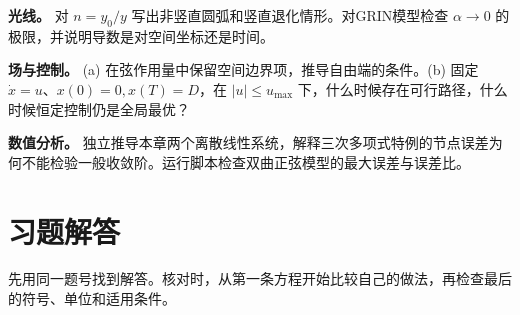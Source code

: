 \begin{bookexercises}
\item {} \textbf{光线。} 对 $n=y_0/y$ 写出非竖直圆弧和竖直退化情形。对GRIN模型检查 $\alpha\to0$ 的极限，并说明导数是对空间坐标还是时间。
\item {} \textbf{场与控制。} (a) 在弦作用量中保留空间边界项，推导自由端的条件。(b) 固定 $\dot x=u$、$x(0)=0,x(T)=D$，在 $|u|\le u_{\max}$ 下，什么时候存在可行路径，什么时候恒定控制仍是全局最优？
\item {} \textbf{数值分析。} 独立推导本章两个离散线性系统，解释三次多项式特例的节点误差为何不能检验一般收敛阶。运行脚本检查双曲正弦模型的最大误差与误差比。
\end{bookexercises}

\section*{习题解答}
先用同一题号找到解答。核对时，从第一条方程开始比较自己的做法，再检查最后的符号、单位和适用条件。
